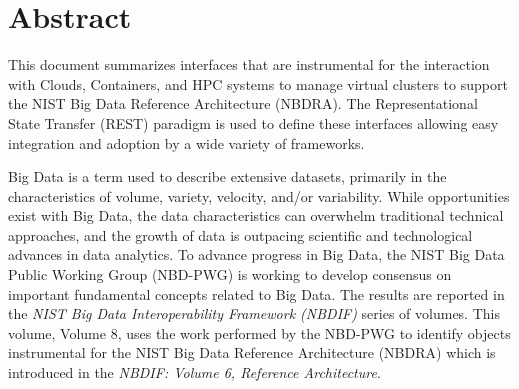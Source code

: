 \section*{\hfil \hspace{4cm} Abstract \hfil}

This document summarizes interfaces that are instrumental for the interaction with Clouds, Containers, and HPC systems to manage virtual clusters to support the NIST Big Data Reference Architecture (NBDRA). The Representational State Transfer (REST) paradigm is used to define these interfaces allowing easy integration and adoption by a wide variety of frameworks.

Big Data is a term used to describe extensive datasets, primarily in the characteristics of volume, variety, velocity, and/or variability. While opportunities exist with Big Data, the data characteristics can overwhelm traditional technical approaches, and the growth of data is outpacing scientific and technological advances in data analytics. To advance progress in Big Data, the NIST Big Data Public Working Group (NBD-PWG) is working to develop consensus on important fundamental concepts related to Big Data. The results are reported in the {\it NIST Big Data Interoperability Framework (NBDIF)} series of volumes. This volume, Volume 8, uses the work performed by the NBD-PWG to identify objects instrumental for the NIST Big Data Reference Architecture (NBDRA) which is introduced in the {\it NBDIF: Volume 6, Reference Architecture}.